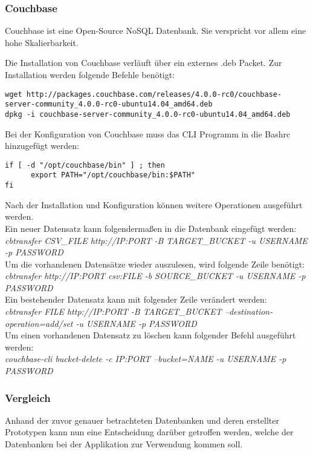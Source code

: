 \subsubsection{Couchbase}
Couchbase ist eine Open-Source NoSQL Datenbank. Sie verspricht vor allem eine hohe Skalierbarkeit.\cite{ABOUTCOUCHBASE}

Die Installation von Couchbase verläuft über ein externes .deb Packet. Zur Installation werden folgende Befehle benötigt:
\begin{lstlisting}[caption=Installation von Couchbase \cite{COUCHBASEINSTALL}]
wget http://packages.couchbase.com/releases/4.0.0-rc0/couchbase- server-community_4.0.0-rc0-ubuntu14.04_amd64.deb
dpkg -i couchbase-server-community_4.0.0-rc0-ubuntu14.04_amd64.deb
\end{lstlisting}

Bei der Konfiguration von Couchbase muss das CLI Programm in die Bashrc hinzugefügt werden:
\begin{lstlisting}[caption=Konfiguration von Couchbase]
if [ -d "/opt/couchbase/bin" ] ; then 
      export PATH="/opt/couchbase/bin:$PATH" 
fi
\end{lstlisting}

Nach der Installation und Konfiguration können weitere Operationen ausgeführt werden.\\
Ein neuer Datensatz kann folgendermaßen in die Datenbank eingefügt werden:\\
\textit{cbtransfer CSV\_FILE http://IP:PORT -B TARGET\_BUCKET  -u USERNAME -p PASSWORD}\\
Um die vorhandenen Datensätze wieder auszulesen, wird folgende Zeile benötigt:\\
\textit{cbtransfer http://IP:PORT csv:FILE -b SOURCE\_BUCKET  -u USERNAME -p PASSWORD}\\
Ein bestehender Datensatz kann mit folgender Zeile verändert werden:\\
\textit{cbtransfer FILE http://IP:PORT -B TARGET\_BUCKET  --destination-operation=add/set -u USERNAME -p PASSWORD}\\
Um einen vorhandenen Datensatz zu löschen kann folgender Befehl ausgeführt werden:\\
\textit{couchbase-cli bucket-delete -c IP:PORT  --bucket=NAME  -u USERNAME -p PASSWORD}

\subsubsection{Vergleich}
Anhand der zuvor genauer betrachteten Datenbanken und deren erstellter Prototypen kann nun eine Entscheidung darüber getroffen werden, welche der Datenbanken bei der Applikation zur Verwendung kommen soll.


